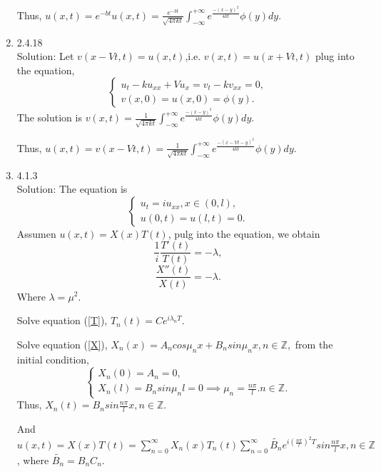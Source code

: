 \documentclass[12pt]{article}%
\begin{document}
\begin{enumerate}
 Thus, $u(x,t)=e^{-bt}u(x,t)=\frac{e^{-bt}}{\sqrt{4 \pi k t}} \int_{-\infty}^{+\infty} e^\frac{-(x-y)^{2}}{4kt}\phi(y) dy$.

\item 2.4.18\\
Solution: Let $v(x-Vt,t)=u(x,t)$,i.e. $v(x,t)=u(x+Vt,t)$ plug into the equation,
\begin{equation*}
    \begin{cases}
        u_{t}-ku_{xx}+Vu_{x}=v_{t}-kv_{xx}=0,
        \\
        v(x,0)=u(x, 0)=\phi(y).
    \end{cases} 
\end{equation*}
The solution is $v(x, t) =\frac{1}{\sqrt{4 \pi k t}} \int_{-\infty}^{+\infty} e^\frac{-(x-y)^{2}}{4kt}\phi(y) dy$.

Thus, $u(x,t)=v(x-Vt, t)=\frac{1}{\sqrt{4 \pi k t}} \int_{-\infty}^{+\infty} e^\frac{-(x-Vt-y)^{2}}{4kt}\phi(y) dy$.


\item 4.1.3\\
Solution: The equation is 
\begin{equation*}
    \begin{cases}
        u_{t}=iu_{xx}, x\in (0,l),
        \\
        u(0,t)=u(l,t)=0.
    \end{cases}
\end{equation*}
Assumen $u(x,t)=X(x)T(t)$, pulg into the equation, we obtain 
\begin{equation}\label{T}
        \frac{1}{i}\frac{T'(t)}{T(t)}=-\lambda,
\end{equation}
\begin{equation}\label{X}
    \frac{X''(t)}{X(t)}=-\lambda.
\end{equation}
Where $\lambda =\mu^2$.

Solve equation (\ref*{T}), $T_{n}(t)=Ce^{i\lambda_{n} T}$.

Solve equation (\ref*{X}), $X_{n}(x)=A_{n}cos\mu_{n}x+B_{n}sin\mu_{n}x, n\in \mathbb{Z}, $ from the initial condition,
\begin{equation*}
    \begin{cases}
    X_{n}(0)=A_{n}=0,
    \\
    X_{n}(l)=B_{n}sin\mu_{n}l=0 \implies \mu_{n} = \frac{n\pi}{l}. n\in \mathbb{Z}.
\end{cases}
\end{equation*}
Thus, $X_{n}(t)=B_{n}sin\frac{n\pi}{l}x, n\in \mathbb{Z}$.

And $u(x,t)=X(x)T(t)=\sum_{n=0}^{\infty  } X_{n}(x)T_{n}(t) \sum_{n=0}^{\infty  } \widetilde{B_{n}}  e^{i(\frac{n\pi}{l})^2T}sin\frac{n\pi}{l}x, n\in \mathbb{Z}$, where $\widetilde{B_{n}}=B_{n}C_{n}$.




\end{enumerate}
   
    
    
\end{document}
